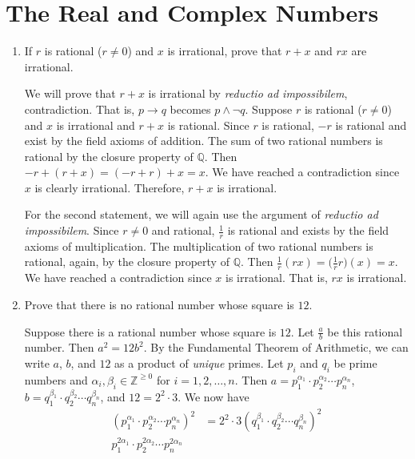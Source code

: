 \chapter{The Real and Complex Numbers}

\begin{enumerate}
\item
  If \(r\) is rational (\(r\neq 0\)) and \(x\) is irrational, prove that
  \(r + x\) and \(rx\) are irrational.
  \par\smallskip
  We will prove that \(r + x\) is irrational by
  \textit{reductio ad impossibilem}, contradiction.
  That is, \(p\to q\) becomes \(p\wedge\neg q\).
  Suppose \(r\) is rational (\(r\neq 0\)) and \(x\) is irrational and
  \(r + x\) is rational.
  Since \(r\) is rational, \(-r\) is rational and exist by the field axioms of
  addition.
  The sum of two rational numbers is rational by the closure property of
  \(\mathbb{Q}\).
  Then \(-r + (r + x) = (-r + r) + x = x\).
  We have reached a contradiction since \(x\) is clearly irrational.
  Therefore, \(r + x\) is irrational.
  \par\smallskip
  For the second statement, we will again use the argument of
  \textit{reductio ad impossibilem}.
  Since \(r\neq 0\) and rational, \(\frac{1}{r}\) is rational and exists by the
  field axioms of multiplication.
  The multiplication of two rational numbers is rational, again, by the
  closure property of \(\mathbb{Q}\).
  Then \(\frac{1}{r}(rx) = \bigl(\frac{1}{r}r\bigr)(x) = x\).
  We have reached a contradiction since \(x\) is irrational.
  That is, \(rx\) is irrational.
\item
  Prove that there is no rational number whose square is \(12\).
  \par\smallskip
  Suppose there is a rational number whose square is \(12\).
  Let \(\frac{a}{b}\) be this rational number.
  Then \(a^2 = 12b^2\).
  By the Fundamental Theorem of Arithmetic, we can write \(a\), \(b\), and
  \(12\) as a product of \textit{unique} primes.
  Let \(p_i\) and \(q_i\) be prime numbers and
  \(\alpha_i, \beta_i\in\mathbb{Z}^{\geq 0}\) for \(i = 1, 2, \ldots, n\).
  Then \(a = p_1^{\alpha_1}\cdot p_2^{\alpha_2}\cdots p_n^{\alpha_n}\),
  \(b = q_1^{\beta_1}\cdot q_2^{\beta_2}\cdots q_n^{\beta_n}\), and
  \(12 = 2^2\cdot 3\).
  We now have
  \begin{align*}
    (p_1^{\alpha_1}\cdot p_2^{\alpha_2}\cdots p_n^{\alpha_n})^2
    &= 2^2\cdot 3(q_1^{\beta_1}\cdot q_2^{\beta_2}\cdots q_n^{\beta_n})^2\\
    p_1^{2\alpha_1}\cdot p_2^{2\alpha_2}\cdots p_n^{2\alpha_n}

\end{align*}
\end{enumerate}
